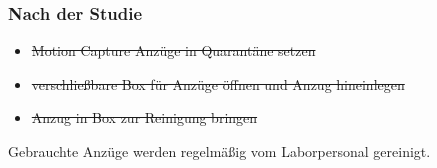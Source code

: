 \subsubsection*{Nach der Studie}

{
\singlespacing
\begin{itemize}
    \item \sout{Motion Capture Anzüge in Quarantäne setzen}
    \item \sout{verschließbare Box für Anzüge öffnen und Anzug hineinlegen}
    \item \sout{Anzug in Box zur Reinigung bringen}
\end{itemize}
}

Gebrauchte Anzüge werden regelmäßig vom Laborpersonal gereinigt.

